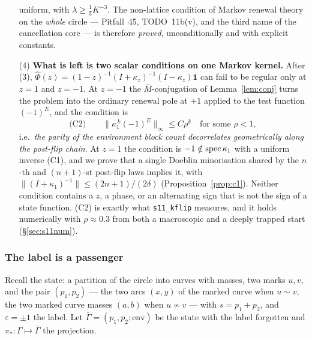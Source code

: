 \begin{enumerate}[leftmargin=2.2em]
uniform, with $\lambda\ge\tfrac13K^{-3}$.  The non-lattice condition of
Markov renewal theory on the \emph{whole} circle --- Pitfall~45,
TODO~11b(v), and the third name of the cancellation core --- is
therefore \emph{proved}, unconditionally and with explicit constants.
\item[(4)] \textbf{What is left is two scalar conditions on one Markov
kernel.}  After (3), $\widehat\Phi(z)=(1-z)^{-1}(I+\kappa_z)^{-1}
(I-\kappa_z)\mathbf 1$ can fail to be regular only at $z=1$ and
$z=-1$.  At $z=-1$ the $\bar M$-conjugation of Lemma~\ref{lem:conj}
turns the problem into the ordinary renewal pole at $+1$ applied to the
test function $(-1)^{E}$, and the condition is
\[
\text{(C2)}\qquad
\bigl\|\kappa_1^{\,k}(-1)^{E}\bigr\|_\infty\le C\rho^k
\quad\text{for some }\rho<1 ,
\]
i.e.\ \emph{the parity of the environment block count decorrelates
geometrically along the post-flip chain}.  At $z=1$ the condition is
$-1\notin\operatorname{spec}\kappa_1$ with a uniform inverse (C1), and we prove that
a single Doeblin minorisation shared by the $n$-th and $(n{+}1)$-st
post-flip laws implies it, with
$\|(I+\kappa_1)^{-1}\|\le(2n+1)/(2\delta)$
(Proposition~\ref{prop:c1}).  Neither condition contains a $z$, a
phase, or an alternating sign that is not the sign of a state function.
(C2) is exactly what \texttt{s11\_kflip} measures, and it holds
numerically with $\rho\approx0.3$ from both a macroscopic and a deeply
trapped start (\S\ref{sec:s11num}).
\end{enumerate}

\subsubsection{The label is a passenger}\label{sec:s11quotient}

Recall the state: a partition of the circle into curves with masses,
two marks $u,v$, and the pair $(p_1,p_2)$ --- the two arcs $(x,y)$ of
the marked curve when $u\sim v$, the two marked curve masses $(a,b)$
when $u\not\sim v$ --- with $s=p_1+p_2$, and $\varepsilon=\pm1$ the
label.  Let $\bar\Gamma=(p_1,p_2;\mathrm{env})$ be the state with the
label forgotten and $\pi_\ast:\Gamma\mapsto\bar\Gamma$ the projection.

